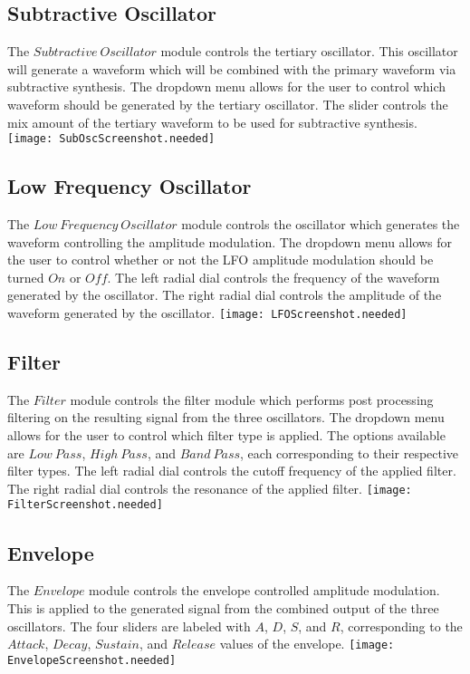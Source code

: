 \documentclass[a4paper,12pt]{report}
\begin{document}
\subsection{Subtractive Oscillator}
The $Subtractive\ Oscillator$ module controls the tertiary oscillator. This oscillator will generate a waveform which will be combined with the primary waveform via subtractive synthesis. The dropdown menu allows for the user to control which waveform should be generated by the tertiary oscillator. The slider controls the mix amount of the tertiary waveform to be used for subtractive synthesis.
\texttt{[image: SubOscScreenshot.needed]}
\subsection{Low Frequency Oscillator}
The $Low\ Frequency\ Oscillator$ module controls the oscillator which generates the waveform controlling the amplitude modulation. The dropdown menu allows for the user to control whether or not the LFO amplitude modulation should be turned $On$ or $Off$. The left radial dial controls the frequency of the waveform generated by the oscillator. The right radial dial controls the amplitude of the waveform generated by the oscillator.
\texttt{[image: LFOScreenshot.needed]}
\subsection{Filter}
The $Filter$ module controls the filter module which performs post processing filtering on the resulting signal from the three oscillators. The dropdown menu allows for the user to control which filter type is applied. The options available are $Low\ Pass$, $High\ Pass$, and $Band\ Pass$, each corresponding to their respective filter types. The left radial dial controls the cutoff frequency of the applied filter. The right radial dial controls the resonance of the applied filter.
\texttt{[image: FilterScreenshot.needed]}
\subsection{Envelope}
The $Envelope$ module controls the envelope controlled amplitude modulation. This is applied to the generated signal from the combined output of the three oscillators. The four sliders are labeled with $A$, $D$, $S$, and $R$, corresponding to the $Attack$, $Decay$, $Sustain$, and $Release$ values of the envelope.
\texttt{[image: EnvelopeScreenshot.needed]}
\end{document}
